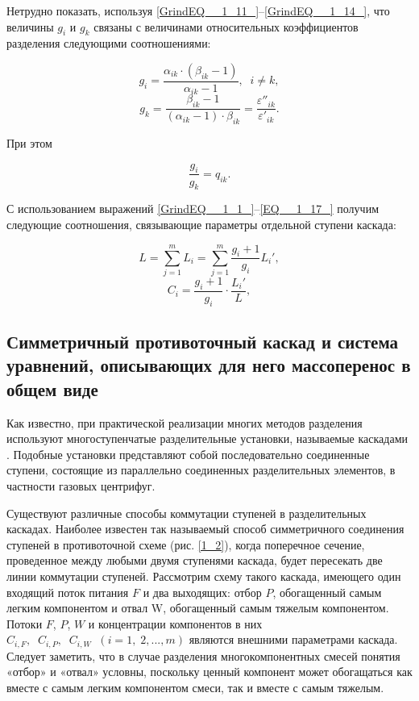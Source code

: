 Нетрудно показать, используя \ref{GrindEQ__1_11_}--\ref{GrindEQ__1_14_}, что величины $g_{i}$ и $g_{k}$  связаны с величинами относительных коэффициентов разделения следующими соотношениями:

\begin{equation} \label{EQ__1_15_} 
  g_{i} =\frac{\alpha _{ik}  \cdot (\beta _{ik} -1)}{\alpha _{ik} -1} ,\; \; i\ne k,           
  \end{equation} 
  \begin{equation} \label{EQ__1_16_} 
  g_{k} =\frac{\beta _{ik} -1}{(\alpha _{ik} -1) \cdot \beta _{ik} } =\frac{\varepsilon ''_{ik} }{\varepsilon '_{ik} } . 
\end{equation} 

При этом

\begin{equation} \label{EQ__1_17_} 
  \frac{g_{i} }{g_{k} } =q_{ik} .           
\end{equation} 

С использованием выражений \ref{GrindEQ__1_1_}--\ref{EQ__1_17_} получим следующие соотношения, связывающие параметры отдельной ступени каскада:

\begin{equation} \label{GrindEQ__1_18_} 
  L=\sum _{j=1}^{m}L_{i}  =\sum _{j=1}^{m}\frac{g_{i} +1}{g_{i} }  L_{i} ',               
  \end{equation} 
  \begin{equation} \label{GrindEQ__1_19_} 
  C_{i} =\frac{g_{i} +1}{g_{i} } \cdot \frac{L_{i} '}{L} ,         
\end{equation}   

\subsection{Симметричный противоточный каскад и система уравнений, описывающих для него массоперенос в общем виде}

Как известно, при практической реализации многих методов разделения используют многоступенчатые разделительные установки, называемые каскадами \cite{sulaberidzeTeoriyaKaskadovDlya2011}. Подобные установки представляют собой последовательно соединенные ступени, состоящие из параллельно соединенных разделительных элементов, в частности газовых центрифуг.

Существуют различные способы коммутации ступеней в разделительных каскадах. Наиболее известен так называемый способ симметричного соединения ступеней в противоточной схеме (рис. \ref{1_2}), когда поперечное сечение, проведенное между любыми двумя ступенями каскада, будет пересекать две линии коммутации ступеней. Рассмотрим схему такого каскада, имеющего один входящий поток питания $F$ и два выходящих: отбор $P$, обогащенный самым легким компонентом и отвал W, обогащенный самым тяжелым компонентом. Потоки $F$, $P$, $W$ и концентрации компонентов в них $C_{i,F} ,\; \; C_{i,P} ,\; \; C_{i,W} \; \; (i=1,\; 2,...,m)$ являются внешними параметрами каскада. Следует заметить, что в случае разделения многокомпонентных смесей понятия «отбор» и «отвал» условны, поскольку ценный компонент может обогащаться как вместе с самым легким компонентом смеси, так и вместе с самым тяжелым.

